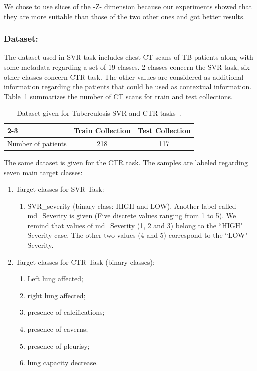 \documentclass{llncs}
\begin{document}
We chose to use slices of the -Z- dimension because our experiments showed that they are more suitable than those of the two other ones and got better results.

\subsubsection{Dataset:}
The dataset used in SVR task includes chest CT scans of TB patients along with some metadata regarding a set of 19 classes. 2 classes concern the SVR task, six other classes concern CTR task. The other values are considered as additional information regarding the patients that could be used as contextual information. Table~\ref{tab1} summarizes the number of CT scans for train and test collections.

\begin{table}
\center
\caption{Dataset given for Tuberculosis SVR and CTR tasks~\cite{ImageCLEF19}.}
\label{tab1}
\begin{tabular}{|l|c|c|}
\cline{2-3}
\multicolumn{1}{}{}  & 	\multicolumn{1}{|c|}{Train Collection}  &	\multicolumn{1}{|c|}{Test Collection}  \\
\hline
Number of patients 			&	218 					&		117\\
\hline
\end{tabular}
\end{table}

The same dataset is given for the CTR task. The samples are labeled regarding seven main target classes: 
\begin{enumerate}
\item Target classes for SVR Task:
\begin{enumerate}
\item SVR\_severity (binary class: HIGH and LOW). Another label called md\_Severity is given (Five discrete values ranging from 1 to 5). We remind that values of md\_Severity (1, 2 and 3) belong to the ``HIGH" Severity case. The other two values (4 and 5) correspond to the ``LOW" Severity.
\end{enumerate}
\item Target classes for CTR Task (binary classes):
\begin{enumerate}
\item Left lung affected;
\item right lung affected;
\item presence of calcifications;
\item presence of caverns;
\item presence of pleurisy;
\item lung capacity decrease.
\end{enumerate}
\end{enumerate}
\end{document}

